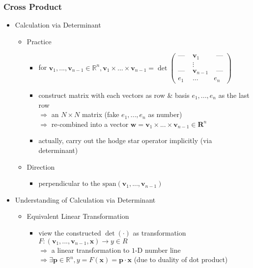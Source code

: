 \subsubsection{Cross Product}
\begin{itemize}
\item Calculation via Determinant
	\begin{itemize}
	\item Practice
		\begin{itemize}
		\item for $\mathbf v_1,...,\mathbf v_{n-1}\in\mathbb R^n, \mathbf v_1\times...\times \mathbf v_{n-1}=\det\left( \begin{smallmatrix} \text{--- }& \mathbf v_1 &\text{ ---} \\ &\vdots& \\ \text{--- }& \mathbf v_{n-1} &\text{ ---} \\ e_1 & \dots & e_n \end{smallmatrix} \right)$
		\item construct matrix with each vectors as row \& basis $e_1,...,e_n$ as the last row \\ 
		$\Rightarrow$ an $N\times N$ matrix (fake $e_1,...,e_n$ as number) \\
		$\Rightarrow$ re-combined into a vector $\mathbf w=\mathbf v_1\times...\times \mathbf v_{n-1}\in\mathbf R^n$
		\item actually, carry out the hodge star operator implicitly (via determinant)
		\end{itemize}
	\item Direction
		\begin{itemize}
		\item perpendicular to the $\text{span}(\mathbf v_1,...,\mathbf v_{n-1})$
		\end{itemize}
	\end{itemize}
\item Understanding of Calculation via Determinant
	\begin{itemize}
	\item Equivalent Linear Transformation
		\begin{itemize}
			\item view the constructed $\det(\cdot)$ as transformation $F:(\mathbf v_1,...,\mathbf v_{n-1}, \mathbf x) \rightarrow y \in R$ \\
			$\Rightarrow$ a linear transformation to $1$-D number line \\
			$\Rightarrow \exists \mathbf p\in\mathbb R^n, y=F(\mathbf x) = \mathbf p \cdot \mathbf x$ (due to duality of dot product)

\end{itemize}
\end{itemize}
\end{itemize}
